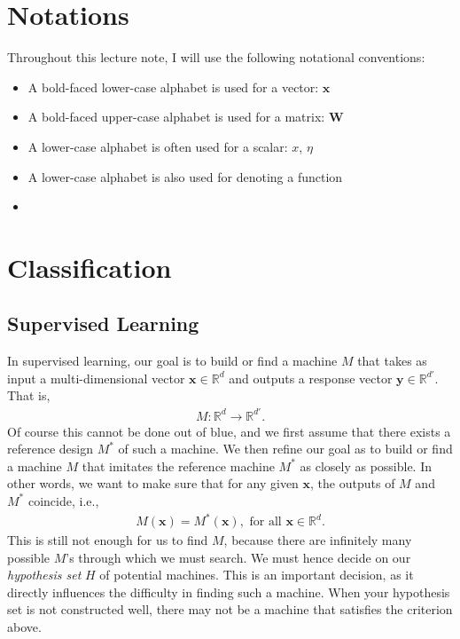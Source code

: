 \documentclass{report}
\newcommand{\vect}[1]{\mathbf{#1}}
\newcommand{\matr}[1]{\mathbf{#1}}
\newcommand{\vx}[0]{\vect{x}}
\newcommand{\vy}[0]{\vect{y}}
\newcommand{\mW}[0]{\matr{W}}
\begin{document}
\chapter*{Notations}

Throughout this lecture note, I will use the following notational conventions:
\begin{itemize}
    \item A bold-faced lower-case alphabet is used for a vector: $\vx$
    \item A bold-faced upper-case alphabet is used for a matrix: $\mW$
    \item A lower-case alphabet is often used for a scalar: $x$, $\eta$
    \item A lower-case alphabet is also used for denoting a function
    \item 
\end{itemize}


\chapter{Classification}
\label{sec:classification}

\section{Supervised Learning}

In supervised learning, our goal is to build or find a machine $M$ that takes as
input a multi-dimensional vector $\vx \in \mathbb{R}^d$ and outputs a response
vector $\vy \in \mathbb{R}^{d'}$.  That is,
\begin{align*}
    M: \mathbb{R}^d \to \mathbb{R}^{d'}.
\end{align*}
Of course this cannot be done out of blue, and we first assume that there exists
a reference design $M^*$ of such a machine.  We then refine our goal as to build
or find a machine $M$ that imitates the reference machine $M^*$ as closely as
possible. In other words, we want to make sure that for any given $\vx$, the
outputs of $M$ and $M^*$ coincide, i.e.,
\begin{align}
    \label{eq:classification0}
    M(\vx) = M^*(\vx),\text{ for all } \vx \in \mathbb{R}^d.
\end{align}
This is still not enough for us to find $M$, because there are infinitely many
possible $M$'s through which we must search. We must hence decide on our {\it
hypothesis set} $H$ of potential machines. This is an important decision, as it
directly influences the difficulty in finding such a machine. When your
hypothesis set is not constructed well, there may not be a machine that
satisfies the criterion above. 
\end{document}
